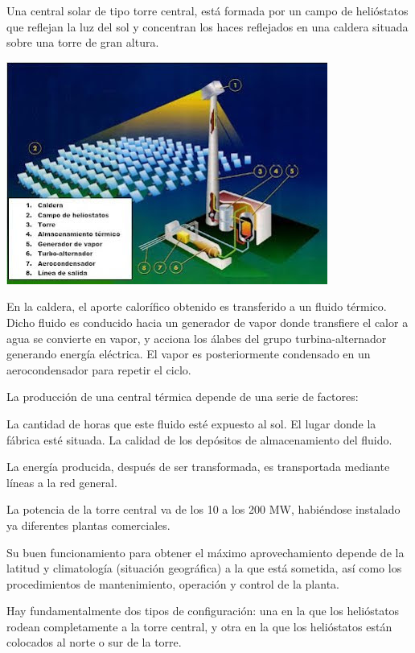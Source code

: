 \documentclass[12pt]{article}
\begin{document}
Una central solar de tipo torre central, está formada por un campo de helióstatos que reflejan la luz del sol y concentran los haces reflejados en una caldera situada sobre una torre de gran altura.

\includegraphics[width=\textwidth]{unnamed (2).jpg}

En la caldera, el aporte calorífico obtenido es transferido a un fluido térmico. Dicho fluido es conducido hacia un generador de vapor donde transfiere el calor a agua se convierte en vapor, y acciona los álabes del grupo turbina-alternador generando energía eléctrica. El vapor es posteriormente condensado en un aerocondensador para repetir el ciclo.

La producción de una central térmica depende de una serie de factores:

La cantidad de horas que este fluido esté expuesto al sol.
El lugar donde la fábrica esté situada.
La calidad de los depósitos de almacenamiento del fluido.

La energía producida, después de ser transformada, es transportada mediante líneas a la red general. \cite{LuciaRinconWebSite}

La potencia de la torre central va de los 10 a los 200 MW, habiéndose instalado ya diferentes plantas comerciales.

Su buen funcionamiento para obtener el máximo aprovechamiento depende de la latitud y climatología (situación geográfica) a la que está sometida, así como los procedimientos de mantenimiento, operación y control de la planta.

Hay fundamentalmente dos tipos de configuración: una en la que los helióstatos rodean completamente a la torre central, y otra en la que los helióstatos están colocados al norte o sur de la torre.
\end{document}
